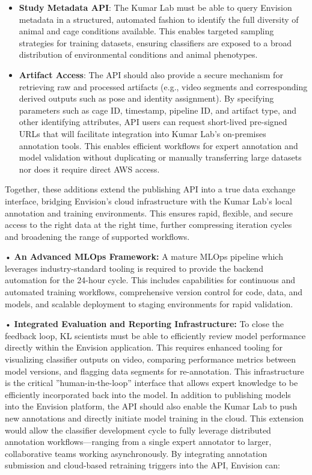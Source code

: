 \documentclass[11pt,a4paper]{article}
\begin{document}
\begin{itemize}
    \item \textbf{Study Metadata API}: The Kumar Lab must be able to query Envision metadata in a structured, automated fashion to identify the full diversity of animal and cage conditions available. This enables targeted sampling strategies for training datasets, ensuring classifiers are exposed to a broad distribution of environmental conditions and animal phenotypes. 
    
    \item \textbf{Artifact Access}: The API should also provide a secure mechanism for retrieving raw and processed artifacts (e.g., video segments and corresponding derived outputs such as pose and identity assignment). By specifying parameters such as cage ID, timestamp, pipeline ID, and artifact type, and other identifying attributes, API users can request short-lived pre-signed URLs that will facilitate integration into Kumar Lab’s on-premises annotation tools. This enables efficient workflows for expert annotation and model validation without duplicating or manually transferring large datasets nor does it require direct AWS access.

\end{itemize}Together, these additions extend the publishing API into a true data exchange interface, bridging Envision’s cloud infrastructure with the Kumar Lab’s local annotation and training environments. This ensures rapid, flexible, and secure access to the right data at the right time, further compressing iteration cycles and broadening the range of supported workflows.

•\textbf{ An Advanced MLOps Framework:} A mature MLOps pipeline which leverages industry-standard tooling is required to provide the backend automation for the 24-hour cycle. This includes capabilities for continuous and automated training workflows, comprehensive version control for code, data, and models, and scalable deployment to staging environments for rapid validation.

•\textbf{ Integrated Evaluation and Reporting Infrastructure:} To close the feedback loop, KL scientists must be able to efficiently review model performance directly within the
Envision application. This requires enhanced tooling for visualizing classifier outputs on video, comparing performance metrics between model versions, and flagging data segments for re-annotation. This infrastructure is the critical ”human-in-the-loop” interface that allows expert knowledge to be efficiently incorporated back into the model. In addition to publishing models into the Envision platform, the API should also enable the Kumar Lab to push new annotations and directly initiate model training in the cloud. This extension would allow the classifier development cycle to fully leverage distributed annotation workflows—ranging from a single expert annotator to larger, collaborative teams working asynchronously. By integrating annotation submission and cloud-based retraining triggers into the API, Envision can:
\end{document}
